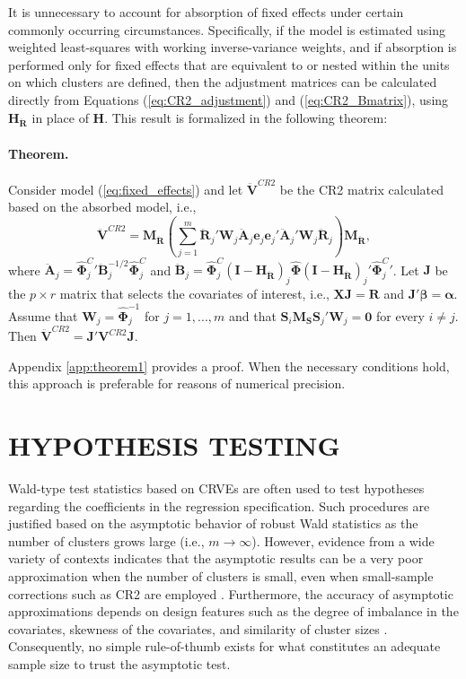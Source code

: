 \documentclass[12pt]{article}
\newcommand{\bm}{\mathbf}
\newcommand{\bs}{\boldsymbol}
\begin{document}
It is unnecessary to account for absorption of fixed effects under certain commonly occurring circumstances. Specifically, if the model is estimated using weighted least-squares with working inverse-variance weights, and if absorption is performed only for fixed effects that are equivalent to or nested within the units on which clusters are defined, then the adjustment matrices can be calculated directly from Equations (\ref{eq:CR2_adjustment}) and (\ref{eq:CR2_Bmatrix}), using $\bm{H_{\ddot{R}}}$ in place of $\bm{H}$. This result is formalized in the following theorem:

\paragraph{Theorem.} Consider model (\ref{eq:fixed_effects}) and let $\bm{\ddot{V}}^{CR2}$ be the CR2 matrix calculated based on the absorbed model, i.e., 
\[
\bm{\ddot{V}}^{CR2} = \bm{M_{\ddot{R}}}\left(\sum_{j=1}^m \bm{\ddot{R}}_j'\bm{W}_j \bm{\ddot{A}}_j \bm{e}_j \bm{e}_j' \bm{\ddot{A}}_j' \bm{W}_j \bm{\ddot{R}}_j\right) \bm{M_{\ddot{R}}},
\]
where $\bm{\ddot{A}}_j = {\bs{\hat\Phi}_j^C}' \bm{\ddot{B}}_j^{-1/2}\hat{\bs\Phi}_j^C$ and $\bm{\ddot{B}}_j = \hat{\bs\Phi}_j^C\left(\bm{I} - \bm{H_{\ddot{R}}}\right)_j \hat{\bs\Phi} \left(\bm{I} - \bm{H_{\ddot{R}}}\right)_j' {\bs{\hat\Phi}_j^C}'$.
Let $\bm{J}$ be the $p \times r$ matrix that selects the covariates of interest, i.e., $\bm{X}\bm{J} = \bm{R}$ and $\bm{J}'\bs\beta = \bs\alpha$. 
Assume that $\bm{W}_j = \bs{\hat\Phi}_j^{-1}$ for $j = 1,...,m$ and that $\bm{S}_i \bm{M_S}\bm{S}_j'\bm{W}_j = \bm{0}$ for every $i \neq j$. Then $\bm{\ddot{V}}^{CR2} = \bm{J}'\bm{V}^{CR2}\bm{J}$.

Appendix \ref{app:theorem1} provides a proof. When the necessary conditions hold, this approach is preferable for reasons of numerical precision.


\section{HYPOTHESIS TESTING}
\label{sec:testing}

Wald-type test statistics based on CRVEs are often used to test hypotheses regarding the coefficients in the regression specification. 
Such procedures are justified based on the asymptotic behavior of robust Wald statistics as the number of clusters grows large (i.e., $m \to \infty$). 
However, evidence from a wide variety of contexts indicates that the asymptotic results can be a very poor approximation when the number of clusters is small, even when small-sample corrections such as CR2 are employed \citep{Bell2002bias, Bertrand2004how, Cameron2008bootstrap}. 
Furthermore, the accuracy of asymptotic approximations depends on design features such as the degree of imbalance in the covariates, skewness of the covariates, and similarity of cluster sizes \citep{McCaffrey2001generalizations, Tipton2015small, Webb2013wild}. 
Consequently, no simple rule-of-thumb exists for what constitutes an adequate sample size to trust the asymptotic test. 
\end{document}
